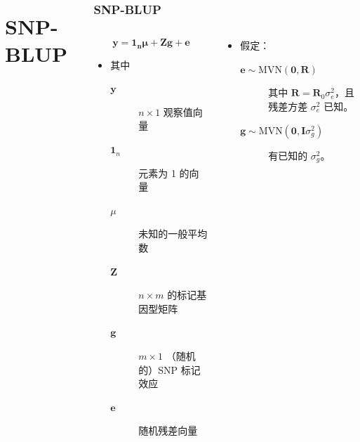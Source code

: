 \documentclass[serif,aspectratio=169]{beamer}
\begin{document}
\begin{frame}
\begin{columns}
\section{SNP-BLUP}
\begin{frame}
  \frametitle{SNP-BLUP}
  \begin{columns}
    \begin{column}{.5\textwidth}
      $$\mathbf{y=1_n\mu+Zg+e}$$
      \begin{itemize}
      \item 其中
        \begin{description}
        \item [$\mathbf{y}$] $n\times 1$ 观察值向量
        \item [$\mathbf{1}_n$] 元素为 1 的向量
        \item [$\mu$] 未知的一般平均数
        \item [$\mathbf{Z}$] $n\times m$ 的标记基因型矩阵
        \item [$\mathbf{g}$] $m\times 1$ （随机的）SNP 标记效应
        \item [$\mathbf{e}$] 随机残差向量
        \end{description}
      \end{itemize}
    \end{column}

    \begin{column}{.5\textwidth}
      \begin{itemize}
      \item 假定：
        \begin{description}
        \item [$\mathbf{e}\sim\mathrm{MVN}(\mathbf{0}, \mathbf{R})$] 其中 $\mathbf{R=R}_0\sigma_e^2$，且残差方差 $\sigma_e^2$ 已知。
        \item [$\mathbf{g}\sim\mathrm{MVN}(\mathbf{0}, \mathbf{I}\sigma_g^2)$] 有已知的 $\sigma_g^2$。
        \end{description}
      \end{itemize}
    \end{column}
  \end{columns}
\end{frame}



\end{columns}
\end{frame}
\end{document}
